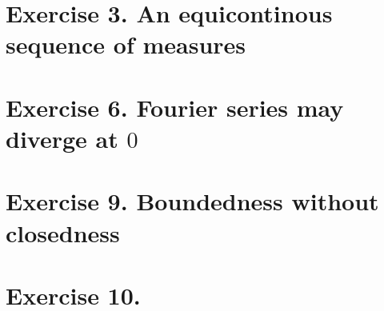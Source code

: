 \section{Exercise 3. An equicontinous sequence of measures}

\section{Exercise 6. Fourier series may diverge at $0$}

\section{Exercise 9. Boundedness without closedness}

\section{Exercise 10. }

%